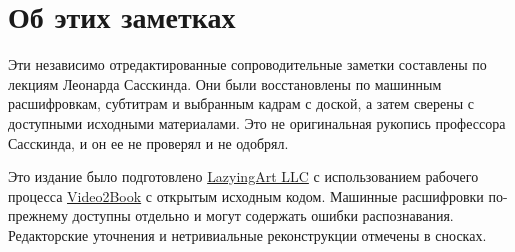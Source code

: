 \documentclass[11pt,oneside]{book}
\begin{document}
\frontmatter
\hypersetup{pageanchor=false}

\hypersetup{pageanchor=true}

\clearpage
\chapter*{Об этих заметках}
Эти независимо отредактированные сопроводительные заметки составлены по лекциям Леонарда Сасскинда. Они были восстановлены по машинным расшифровкам, субтитрам и выбранным кадрам с доской, а затем сверены с доступными исходными материалами. Это не оригинальная рукопись профессора Сасскинда, и он ее не проверял и не одобрял.

Это издание было подготовлено \href{https://lazying.art}{LazyingArt LLC} с использованием рабочего процесса \href{https://github.com/lachlanchen/Video2Book}{Video2Book} с открытым исходным кодом. Машинные расшифровки по-прежнему доступны отдельно и могут содержать ошибки распознавания. Редакторские уточнения и нетривиальные реконструкции отмечены в сносках.
\clearpage
\tableofcontents
\mainmatter








\end{document}
